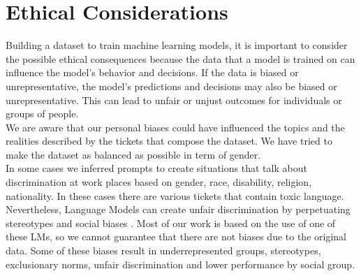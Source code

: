 \chapter{Ethical Considerations}
Building a dataset to train machine learning models, it is important to consider the possible ethical consequences because the data that a model is trained on can influence the model's behavior and decisions. If the data is biased or unrepresentative, the model's predictions and decisions may also be biased or unrepresentative. This can lead to unfair or unjust outcomes for individuals or groups of people. \\
We are aware that our personal biases could have influenced the topics and the realities described by the tickets that compose the dataset. We have tried to make the dataset as balanced as possible in term of gender. \\
In some cases we inferred prompts to create situations that talk about discrimination at work places based on gender, race, disability, religion, nationality. In these cases there are various tickets that contain toxic language. \\
Nevertheless, Language Models can create unfair discrimination by perpetuating stereotypes and social biases \cite{abid2021persistent}\cite{lucy-bamman-2021-gender}. Most of our work is based on the use of one of these LMs, so we cannot guarantee that there are not biases due to the original data. Some of these biases result in underrepresented groups, stereotypes, exclusionary norms, unfair discrimination and lower performance by social group\cite{weidinger2021ethical}. 

